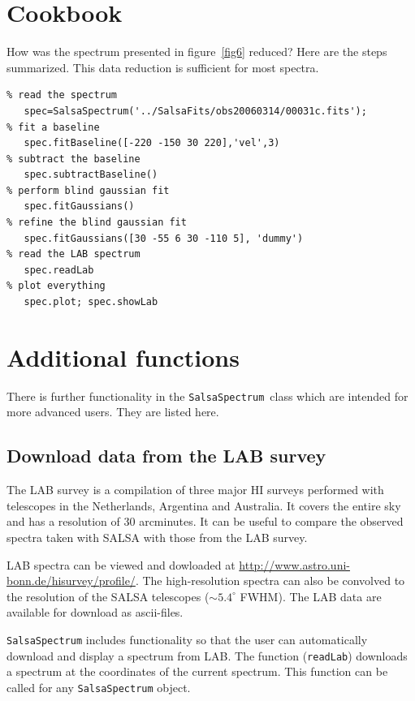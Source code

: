 \documentclass[11pt,a4paper]{article}
\begin{document}
\section{Cookbook}
\label{sec:cookbook}

How was the spectrum presented in figure~\ref{fig6}
reduced? Here are the steps summarized. This data
reduction is sufficient for most spectra.
\begin{lstlisting}
% read the spectrum
   spec=SalsaSpectrum('../SalsaFits/obs20060314/00031c.fits'); 
% fit a baseline
   spec.fitBaseline([-220 -150 30 220],'vel',3) 
% subtract the baseline
   spec.subtractBaseline() 
% perform blind gaussian fit
   spec.fitGaussians()
% refine the blind gaussian fit
   spec.fitGaussians([30 -55 6 30 -110 5], 'dummy') 
% read the LAB spectrum
   spec.readLab
% plot everything
   spec.plot; spec.showLab
\end{lstlisting}


\newpage
\section{Additional functions}
\label{sec:additional-function}

There is further functionality in the \texttt{SalsaSpectrum}~class
which are intended for more advanced users. They are listed here.

\subsection{Download data from the LAB survey}
\label{sec:download-data-from}

The LAB survey is a compilation of three major HI surveys performed
with telescopes in the Netherlands, Argentina and Australia. It covers
the entire sky and has a resolution of $30$ arcminutes. It can be
useful to compare the observed spectra taken with SALSA with those
from the LAB survey.

LAB spectra can be viewed and dowloaded at
\url{http://www.astro.uni-bonn.de/hisurvey/profile/}. The
high-resolution spectra can also be convolved to the resolution of the
SALSA telescopes ($\sim 5.4^{\circ}$ FWHM). The LAB data are available
for download as ascii-files.

\texttt{SalsaSpectrum} includes functionality so that the user can
automatically download and display a spectrum from LAB. The function
(\texttt{readLab}) downloads a spectrum at the coordinates of the
current spectrum. This function can be called for any
\texttt{SalsaSpectrum} object.
\end{document}

